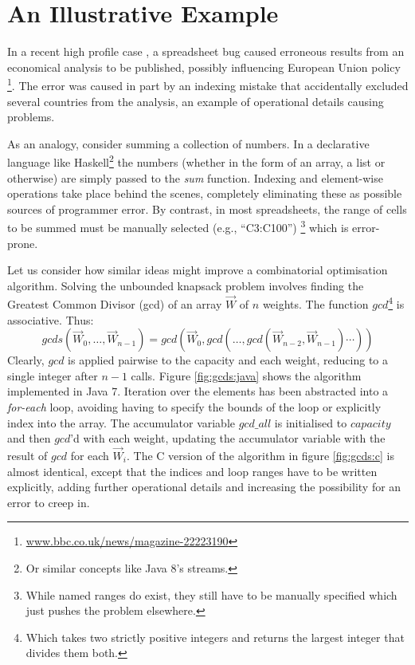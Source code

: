 \section{An Illustrative Example}

In a recent high profile case \cite{Herndon13}, a spreadsheet bug caused
erroneous results from an economical analysis to be published, possibly
influencing European Union policy%
\footnote{\url{www.bbc.co.uk/news/magazine-22223190}}.
The error was caused in part by an indexing mistake that accidentally excluded
several countries from the analysis, an example of operational details causing
problems.

As an analogy, consider summing a collection of numbers. In a declarative
language like Haskell\footnote{Or similar concepts like Java 8's streams.}
the numbers (whether in the form of an array, a list or
otherwise) are simply passed to the \emph{sum} function. Indexing and
element-wise operations take place behind the scenes, completely eliminating
these as possible sources of programmer error. By contrast, in most spreadsheets, the range of cells to
be summed must be manually selected (e.g., ``C3:C100'')%
\footnote{While named ranges do exist, they still have to be manually specified
which just pushes the problem elsewhere.} which is error-prone.

Let us consider how similar ideas might improve a combinatorial
optimisation algorithm. Solving the unbounded knapsack problem involves
finding the Greatest Common Divisor (gcd) of an array $\vec{W}$ of $n$
weights. The function $gcd$\footnote{Which takes two strictly positive integers and returns the largest integer that divides them both.}
is associative. Thus:
\[
gcds (\vec{W}_0, \ldots, \vec{W}_{n-1}) =
gcd(\vec{W}_0,gcd(\ldots,gcd (\vec{W}_{n-2},\vec{W}_{n-1})\cdots))
\]
Clearly, $gcd$ is applied pairwise to the capacity and each weight,
reducing to a single integer after $n - 1$ calls. Figure \ref{fig:gcds:java} shows
the algorithm implemented in Java 7. Iteration over the elements has been
abstracted into a \emph{for-each} loop, avoiding having to specify the bounds
of the loop or explicitly index into the array. The accumulator variable $gcd\_all$ is initialised to
$capacity$ and then $gcd$'d with each weight, updating the accumulator
variable with the result of $gcd$ for each $\vec{W}_i$. The C version of
the algorithm in figure \ref{fig:gcds:c} is almost identical, except that the indices
and loop ranges have to be written explicitly, adding further operational details and 
increasing the possibility for an error to creep in.

